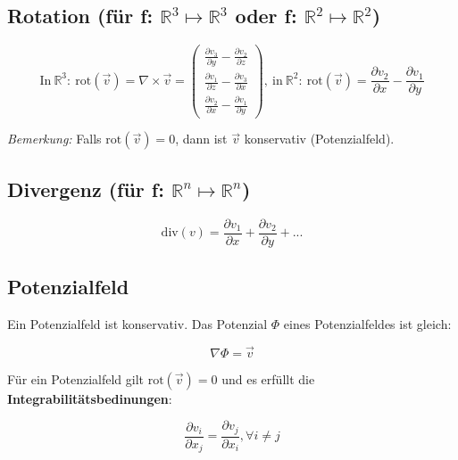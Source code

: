 \documentclass[11pt]{article}
\begin{document}
\subsection{Rotation (f{\"u}r f: $\mathbb{R}^3 \mapsto \mathbb{R}^3$ oder f: $\mathbb{R}^2 \mapsto \mathbb{R}^2$)}

\begin{equation*}
	\text{In}\ \mathbb{R}^3:\ \text{rot}(\vec{v})=\nabla\times \vec{v} =
	\begin{pmatrix}
		\frac{\partial v_3}{\partial y} - \frac{\partial v_2}{\partial z}\\
		\frac{\partial v_1}{\partial z} - \frac{\partial v_3}{\partial x}\\
		\frac{\partial v_2}{\partial x} - \frac{\partial v_1}{\partial y}
	\end{pmatrix},\ \text{in}\ \mathbb{R}^2:\ \text{rot}(\vec{v}) = \frac{\partial v_2}{\partial x} - \frac{\partial v_1}{\partial y}
\end{equation*}

\emph{Bemerkung:} Falls $\text{rot}(\vec{v})=0$, dann ist $\vec{v}$ konservativ (Potenzialfeld).

\subsection{Divergenz (f{\"u}r f: $\mathbb{R}^n \mapsto \mathbb{R}^n$)}
\begin{equation*}
	\text{div}(v)= \frac{\partial v_1}{\partial x} + \frac{\partial v_2}{\partial y} + ... 
\end{equation*}

\subsection{Potenzialfeld}

Ein Potenzialfeld ist konservativ. Das Potenzial $\Phi$ eines Potenzialfeldes ist gleich:

\begin{equation*}
	\nabla \Phi = \vec{v}
\end{equation*}

F{\"u}r ein Potenzialfeld gilt $\text{rot}(\vec{v})=0$ und es erf{\"u}llt die \textbf{Integrabilit{\"a}tsbedinungen}:

\begin{equation*}
	\frac{\partial v_i}{\partial x_j}=\frac{\partial v_j}{\partial x_i},\forall i \neq j
\end{equation*}
\end{document}
